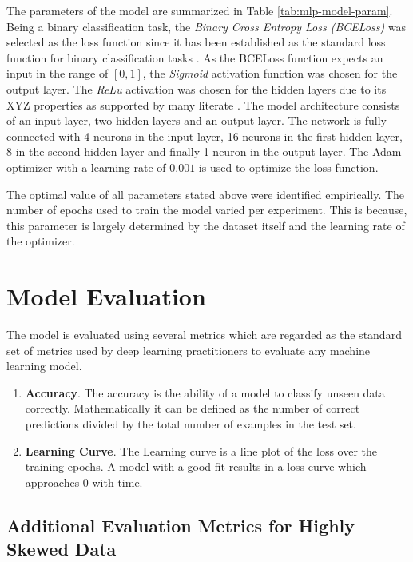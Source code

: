 The parameters of the model are summarized in Table
\ref{tab:mlp-model-param}. Being a binary classification task, the
\textit{Binary Cross Entropy Loss (BCELoss)} was selected as the loss
function since it has been established as the standard loss function
for binary classification tasks \cite{CITEME}. As the BCELoss function
expects an input in the range of $[0, 1]$, the \textit{Sigmoid}
activation function was chosen for the output layer. The \textit{ReLu}
activation was chosen for the hidden layers due to its XYZ properties
as supported by many literate \cite{CITME}. The model architecture
consists of an input layer, two hidden layers and an output layer. The
network is fully connected with 4 neurons in the input layer, 16
neurons in the first hidden layer, 8 in the second hidden layer and
finally 1 neuron in the output layer. The Adam optimizer with a
learning rate of $0.001$ is used to optimize the loss function.

The optimal value of all parameters stated above were identified
empirically. The number of epochs used to train the model varied per
experiment. This is because, this parameter is largely determined by
the dataset itself and the learning rate of the optimizer.

\section{Model Evaluation}
\label{sec:mlp-model-eval}

The model is evaluated using several metrics which are regarded as the
standard set of metrics used by deep learning practitioners to
evaluate any machine learning model.

\begin{enumerate}
\item \textbf{Accuracy}. The accuracy is the ability of a model to
  classify unseen data correctly. Mathematically it can be defined as
  the number of correct predictions divided by the total number of
  examples in the test set.
\item \textbf{Learning Curve}. The Learning curve is a line plot of
  the loss over the training epochs. A model with a good fit results
  in a loss curve which approaches 0 with time.
\end{enumerate}

\subsection{Additional Evaluation Metrics for Highly Skewed Data}
\label{sec:eval-metrics-skewed}


